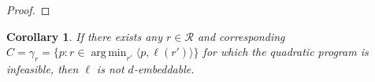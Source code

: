 \documentclass[12pt]{article}
\newcommand{\Comments}{1}
\newcommand{\mytodo}[2]{\ifnum\Comments=1%
  \todo[linecolor=#1!80!black,backgroundcolor=#1,bordercolor=#1!80!black]{#2}\fi}
\newcommand{\jessiet}[1]{\mytodo{purple!20!white}{JF: #1}}
\newcommand{\R}{\mathcal{R}}
\newcommand{\T}{\mathcal{T}}
\newcommand{\inprod}[2]{\langle #1, #2 \rangle}%
\DeclareMathOperator*{\argmin}{arg\,min}
\newtheorem{corollary}{Corollary}
\begin{document}
\begin{proof}
%        
%    
  \end{proof}

  \begin{corollary}
    If there exists any $r \in \R$ and corresponding $C = \gamma_r = \{p : r \in \argmin_{r'} \inprod{p}{\ell(r')} \}$ for which the quadratic program is infeasible, then $\ell$ is not $d$-embeddable.
  \end{corollary}
  
  
\end{document}
